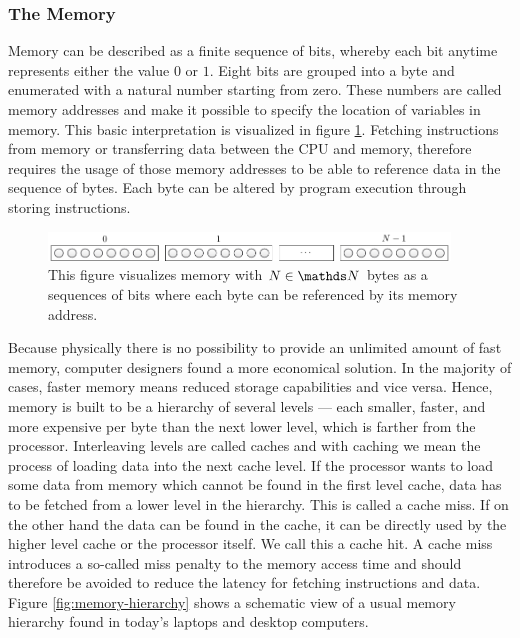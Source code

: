 \documentclass{stdlocal}
\begin{document}
    \subsubsection*{The Memory}
    Memory can be described as a finite sequence of bits, whereby each bit anytime represents either the value $0$ or $1$.
    Eight bits are grouped into a byte and enumerated with a natural number starting from zero.
    These numbers are called memory addresses and make it possible to specify the location of variables in memory.
    This basic interpretation is visualized in figure \ref{fig:memory}.
    Fetching instructions from memory or transferring data between the CPU and memory, therefore requires the usage of those memory addresses to be able to reference data in the sequence of bytes.
    Each byte can be altered by program execution through storing instructions.
    \autocite{patterson2014}
    \begin{figure}[H]
      \center
      \includegraphics[width=0.95\textwidth]{figures/memory.pdf}
      \caption[Memory Structure]{%
        This figure visualizes memory with $N\in\setNatural$ bytes as a sequences of bits where each byte can be referenced by its memory address.%
      }
      \label{fig:memory}
    \end{figure}
    Because physically there is no possibility to provide an unlimited amount of fast memory, computer designers found a more economical solution.
    In the majority of cases, faster memory means reduced storage capabilities and vice versa.
    Hence, memory is built to be a hierarchy of several levels --- each smaller, faster, and more expensive per byte than the next lower level, which is farther from the processor.
    Interleaving levels are called caches and with caching we mean the process of loading data into the next cache level.
    If the processor wants to load some data from memory which cannot be found in the first level cache, data has to be fetched from a lower level in the hierarchy.
    This is called a cache miss.
    If on the other hand the data can be found in the cache, it can be directly used by the higher level cache or the processor itself.
    We call this a cache hit.
    A cache miss introduces a so-called miss penalty to the memory access time and should therefore be avoided to reduce the latency for fetching instructions and data.
    Figure \ref{fig:memory-hierarchy} shows a schematic view of a usual memory hierarchy found in today's laptops and desktop computers.
\end{document}
